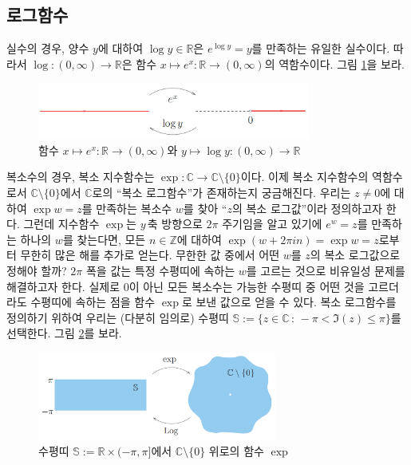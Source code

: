 \subsection{로그함수}

실수의 경우,
양수 $y$에 대하여 $\log y\in \mathbb R$은
$e^{\log y} = y$를 만족하는 유일한 실수이다.
따라서 $\log : (0,\infty) \to \mathbb R$은 
함수 $x\mapsto e^x: \mathbb R \to (0,\infty)$의 역함수이다.
그림 \ref{fig-1-18}을 보라.

\begin{figure}[!h]
\begin{center}
\includegraphics[width=0.8\textwidth]{./SaltChapter/figs/fig-1-18}
\end{center}
\caption{함수 $x\mapsto e^x : \mathbb R \to (0,\infty)$와
$y\mapsto \log y : (0,\infty) \to \mathbb R$}
\label{fig-1-18}
\end{figure}

복소수의 경우,
복소 지수함수는 $\exp: \mathbb C \to \mathbb C\setminus \{0\}$이다.
이제 복소 지수함수의 역함수로서 $\mathbb C\setminus \{0\}$에서 $\mathbb C$로의
``복소 로그함수''가 존재하는지 궁금해진다.
우리는 $z\ne0$에 대하여 $\exp w = z$를 만족하는 복소수 $w$를 찾아
``$z$의 복소 로그값''이라 정의하고자 한다.
그런데  지수함수 $\exp$는 $y\,$축 방향으로 $2\pi$ 주기임을 알고 있기에
$e^w =z$를 만족하는 하나의 $w$를 찾는다면,
모든 $n\in\mathbb Z$에 대하여 $\exp(w+2\pi i n) = \exp w = z$로부터
무한히 많은 해를 추가로 얻는다.
무한한 값 중에서 어떤 $w$를 $z$의 복소 로그값으로 정해야 할까?
$2\pi$ 폭을 값는 특정 수평띠에 속하는
$w$를 고르는 것으로 비유일성 문제를  해결하고자 한다.
실제로 $0$이 아닌 모든 복소수는 
가능한 수평띠 중 어떤 것을 고르더라도 
수평띠에 속하는 점을 함수 $\exp$로 보낸 값으로 얻을 수 있다.
복소 로그함수를 정의하기 위하여
우리는 (다분히 임의로) 수평띠 $\mathbb S := \{ z\in\mathbb C\,:\, -\pi < \Im(z) \le \pi\}$를
선택한다. 그림  \ref{fig-1-19}를 보라.

\begin{figure}[!h]
\begin{center}
\includegraphics[width=0.7\textwidth]{./SaltChapter/figs/fig-1-19}
\end{center}
\caption{수평띠 $\mathbb S := \mathbb R \times (-\pi, \pi]$에서
$\mathbb C\setminus \{0\}$ 위로의 함수 $\exp$}
\label{fig-1-19}
\end{figure}

